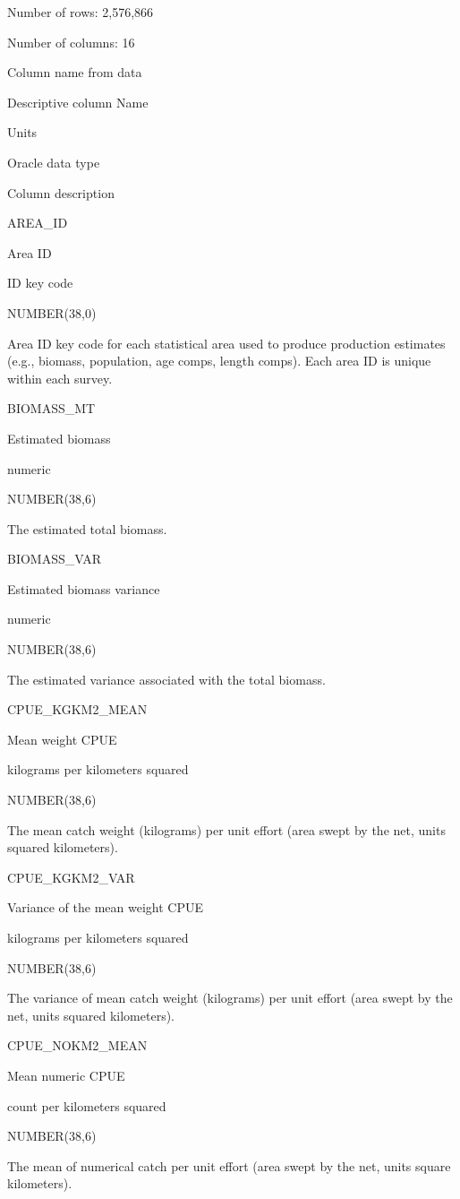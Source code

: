 \documentclass[
  letterpaper,
  oneside,
  open=any]{scrbook}
\begin{document}
Number of rows: 2,576,866

Number of columns: 16

Column name from data

Descriptive column Name

Units

Oracle data type

Column description

AREA\_ID

Area ID

ID key code

NUMBER(38,0)

Area ID key code for each statistical area used to produce production
estimates (e.g., biomass, population, age comps, length comps). Each
area ID is unique within each survey.

BIOMASS\_MT

Estimated biomass

numeric

NUMBER(38,6)

The estimated total biomass.

BIOMASS\_VAR

Estimated biomass variance

numeric

NUMBER(38,6)

The estimated variance associated with the total biomass.

CPUE\_KGKM2\_MEAN

Mean weight CPUE

kilograms per kilometers squared

NUMBER(38,6)

The mean catch weight (kilograms) per unit effort (area swept by the
net, units squared kilometers).

CPUE\_KGKM2\_VAR

Variance of the mean weight CPUE

kilograms per kilometers squared

NUMBER(38,6)

The variance of mean catch weight (kilograms) per unit effort (area
swept by the net, units squared kilometers).

CPUE\_NOKM2\_MEAN

Mean numeric CPUE

count per kilometers squared

NUMBER(38,6)

The mean of numerical catch per unit effort (area swept by the net,
units square kilometers).
\end{document}
